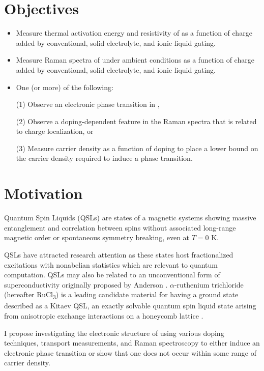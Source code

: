 \documentclass[11pt]{article}
\begin{document}
\begin{multicols}{2}


\section{Objectives}
\begin{itemize}
	\item Measure thermal activation energy and resistivity of \rucl as a function of charge added by conventional, solid electrolyte, and ionic liquid gating.
	\item Measure Raman spectra of \rucl under ambient conditions as a function of charge added by conventional, solid electrolyte, and ionic liquid gating.
	\item One (or more) of the following:
	
	(1) Observe an electronic phase transition in \ruclnospace, 
	
	(2) Observe a doping-dependent feature in the Raman spectra that is related to charge localization, or 
	
	(3) Measure carrier density as a function of doping to place a lower bound on the carrier density required to induce a phase transition.
\end{itemize}

\section{Motivation}
Quantum Spin Liquids (QSLs) are states of a magnetic systems showing massive entanglement and correlation between spins without associated long-range magnetic order or spontaneous symmetry breaking, even at $T = 0$ K. 

QSLs have attracted research attention as these states host fractionalized excitations with nonabelian statistics \cite{Balents2010} which are relevant to quantum computation. QSLs may also be related to an unconventional form of superconductivity originally proposed by Anderson \cite{Lee2008}. $\alpha$-ruthenium trichloride (hereafter RuCl\textsubscript{3}) is a leading candidate material for having a ground state described as a Kitaev QSL, an exactly solvable quantum spin liquid state arising from anisotropic exchange interactions on a honeycomb lattice \cite{Kitaev2006}.

I propose investigating the electronic structure of \rucl using various doping techniques, transport measurements, and Raman spectroscopy to either induce an electronic phase transition or show that one does not occur within some range of carrier density.


\end{multicols}
\end{document}
